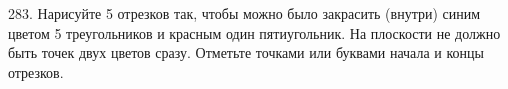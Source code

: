 283. Нарисуйте 5 отрезков так, чтобы можно было закрасить (внутри) синим цветом 5 треугольников и красным один пятиугольник. На плоскости не должно быть точек двух цветов сразу. Отметьте точками или буквами начала и концы отрезков.\\
